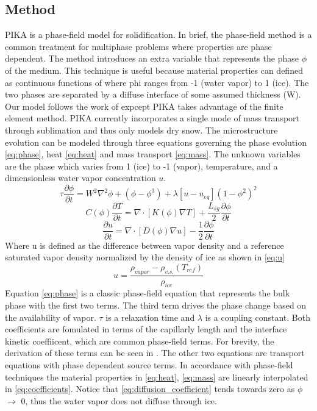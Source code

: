 \documentclass[twoside]{article}
\begin{document}
\begin{multicols}{2}
\section{Method}
PIKA is a phase-field model for solidification. In brief, the phase-field method is a common treatment for multiphase problems where properties are phase dependent. The method introduces an extra variable that represents the phase $\phi$ of the medium. This technique is useful because material properties can defined as continuous functions of where phi ranges from -1 (water vapor) to 1 (ice). The two phases are separated by a diffuse interface of some assumed thickness (W). Our model follows the work of \cite{Plapp_2009} expcept PIKA takes advantage of the finite element method. 
PIKA currently incorporates a single mode of mass transport through sublimation and thus only models dry snow. The microstructure evolution can be modeled through three equations governing the phase evolution \eqref{eq:phase}, heat \eqref{eq:heat} and mass transport \eqref{eq:mass}. The unknown variables are the phase which varies from 1 (ice) to -1 (vapor), temperature, and a dimensionless water vapor concentration $u$.
 \begin{equation} \label{eq:phase}
	\tau \frac{\partial \phi}{\partial t} = W^2 \nabla^2 \phi +(\phi-\phi^3)+\lambda[u-u_{eq}](1-\phi^2)^2 
\end{equation}
\begin{equation}\label{eq:heat}
	C(\phi)\frac{\partial T}{\partial t} = \nabla \cdot [K(\phi) \nabla T] + \frac{L_{sg}}{2}\frac{\partial \phi}{\partial t}
\end{equation} 
\begin{equation} \label{eq:mass}
	\frac{\partial u}{\partial t} = \nabla \cdot[ D(\phi) \nabla u] - \frac{1}{2}\frac{\partial \phi}{\partial t}
\end{equation}
Where u is defined as the difference between vapor density and a reference saturated vapor density normalized by the density of ice as shown in \eqref{eq:u}
\begin{equation} \label{eq:u}
	u = \frac{ \rho_{vapor}-\rho_{v.s.} (T_{ref})}{\rho_{ice}}
\end{equation}
Equation \eqref{eq:phase} is a classic phase-field equation that represents the bulk phase with the first two terms. The third term drives the phase change based on the availability of vapor. $\tau$ is a relaxation time and $\lambda$ is a coupling constant. Both coefficients are fomulated in terms of the capillarly length and the interface kinetic coeffiicent, which are common phase-field terms. For brevity, the derivation of these terms can be seen in \cite{Plapp_2009}. The other two equations are transport equations with phase dependent source terms. In accordance with phase-field techniques the material properties in  \eqref{eq:heat}, \eqref{eq:mass} are linearly interpolated in \eqref{eq:coefficients}. Notice that \ref{eq:diffusion_coefficient} tends towards zero as $\phi$ $\rightarrow$ 0, thus the water vapor does not diffuse through ice.

\end{multicols}
\end{document}
